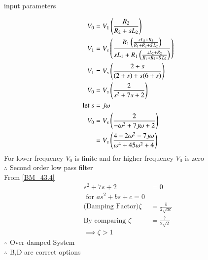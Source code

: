 \documentclass[journal,12pt,onecolumn]{IEEEtran}
\theoremstyle{remark}
\begin{document}
 \begin{table}[!ht]
    \centering
        
    \caption{input parameters}
\end{table}
\begin{align}
    V_0&=V_1\left(\frac{R_2}{R_2+sL_2}\right)\\
   V_1&=V_s\left(\frac{R_1\left(\frac{sL_2+R_2}{R_1+R_2+SL_2}\right)}{sL_1+R_1\left(\frac{sL_2+R_2}{R_1+R_2+SL_2}\right)}\right)\\
   V_1&=V_s\left(\frac{2+s}{(2+s)+s(6+s)}\right)\\
   V_0&=V_s\left(\frac{2}{s^2+7s+2}\right)\\ \label{BM_43.4}
   \text{let } s&=j\omega\\
   V_0&= V_s\left(\frac{2}{-\omega^2 + 7\jmath\omega+2}\right)\\
   &=V_s\left(\frac{4-2\omega^2-7\jmath\omega}{\omega^4+45\omega^2+4}\right)
\end{align}
For lower frequency $V_0$ is finite and for higher frequency $V_0$ is zero\\
 $\therefore $  Second order low pass filter\\
 From \ref{BM_43.4}
\begin{align}
    s^2+7s+2&=0\\
    \text{ for } as^2+bs+c=0\\
\text{(Damping Factor)}\zeta&=\frac{b}{2\sqrt{ac}}\\
\text{By comparing }\zeta&=\frac{7}{2\sqrt{2}}\\
\implies \zeta>1
\end{align}
$\therefore $  Over-damped System\\
$\therefore$ B,D are correct options
\end{document}
